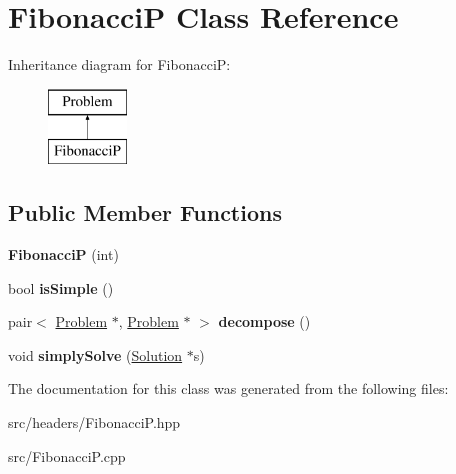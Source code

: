 \hypertarget{classFibonacciP}{\section{Fibonacci\-P Class Reference}
\label{classFibonacciP}
}
Inheritance diagram for Fibonacci\-P\-:\begin{figure}[H]
\begin{center}
\leavevmode
\includegraphics[height=2.000000cm]{classFibonacciP}
\end{center}
\end{figure}
\subsection*{Public Member Functions}
\begin{DoxyCompactItemize}
\item 
\hypertarget{classFibonacciP_a2ecac79d3cfb4e765b116f7d2dce04a4}{{\bfseries Fibonacci\-P} (int)}\label{classFibonacciP_a2ecac79d3cfb4e765b116f7d2dce04a4}

\item 
\hypertarget{classFibonacciP_a692b5a56f21464385b2a966dcaed4d30}{bool {\bfseries is\-Simple} ()}\label{classFibonacciP_a692b5a56f21464385b2a966dcaed4d30}

\item 
\hypertarget{classFibonacciP_afb7a04a7757d573e441928391f9c32e4}{pair$<$ \hyperlink{classProblem}{Problem} $\ast$, \hyperlink{classProblem}{Problem} $\ast$ $>$ {\bfseries decompose} ()}\label{classFibonacciP_afb7a04a7757d573e441928391f9c32e4}

\item 
\hypertarget{classFibonacciP_a71db67e416e6a43472da5e9bcc0877e0}{void {\bfseries simply\-Solve} (\hyperlink{classSolution}{Solution} $\ast$s)}\label{classFibonacciP_a71db67e416e6a43472da5e9bcc0877e0}

\end{DoxyCompactItemize}


The documentation for this class was generated from the following files\-:\begin{DoxyCompactItemize}
\item 
src/headers/Fibonacci\-P.\-hpp\item 
src/Fibonacci\-P.\-cpp\end{DoxyCompactItemize}
